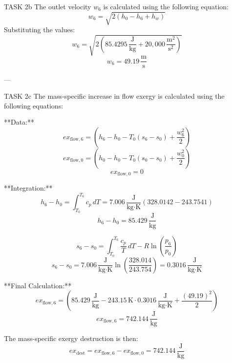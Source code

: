 TASK 2b  
The outlet velocity \( w_6 \) is calculated using the following equation:  
\[
w_6 = \sqrt{2 \left( h_0 - h_6 + h_w \right)}
\]  
Substituting the values:  
\[
w_6 = \sqrt{2 \left( 85.4295 \, \frac{\text{J}}{\text{kg}} + 20,000 \, \frac{\text{m}^2}{\text{s}^2} \right)}
\]  
\[
w_6 = 49.19 \, \frac{\text{m}}{\text{s}}
\]  

---

TASK 2c  
The mass-specific increase in flow exergy is calculated using the following equations:  

**Data:**  
\[
ex_{\text{flow},6} = \left( h_6 - h_0 - T_0 (s_6 - s_0) + \frac{w_6^2}{2} \right)
\]  
\[
ex_{\text{flow},0} = \left( h_0 - h_0 - T_0 (s_0 - s_0) + \frac{w_0^2}{2} \right)
\]  
\[
ex_{\text{flow},0} = 0
\]  

**Integration:**  
\[
h_6 - h_0 = \int_{T_0}^{T_6} c_p \, dT = 7.006 \, \frac{\text{J}}{\text{kg·K}} \left( 328.0142 - 243.7541 \right)
\]  
\[
h_6 - h_0 = 85.429 \, \frac{\text{J}}{\text{kg}}
\]  

\[
s_6 - s_0 = \int_{T_0}^{T_6} \frac{c_p}{T} \, dT - R \ln \left( \frac{p_6}{p_0} \right)
\]  
\[
s_6 - s_0 = 7.006 \, \frac{\text{J}}{\text{kg·K}} \ln \left( \frac{328.014}{243.754} \right) = 0.3016 \, \frac{\text{J}}{\text{kg·K}}
\]  

**Final Calculation:**  
\[
ex_{\text{flow},6} = \left( 85.429 \, \frac{\text{J}}{\text{kg}} - 243.15 \, \text{K} \cdot 0.3016 \, \frac{\text{J}}{\text{kg·K}} + \frac{(49.19)^2}{2} \right)
\]  
\[
ex_{\text{flow},6} = 742.144 \, \frac{\text{J}}{\text{kg}}
\]  

The mass-specific exergy destruction is then:  
\[
ex_{\text{dest}} = ex_{\text{flow},6} - ex_{\text{flow},0} = 742.144 \, \frac{\text{J}}{\text{kg}}
\]  

